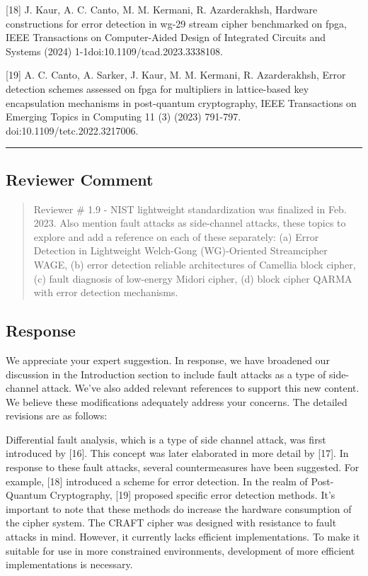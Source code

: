 [18] J. Kaur, A. C. Canto, M. M. Kermani, R. Azarderakhsh, Hardware constructions for error detection in wg-29 stream cipher benchmarked on fpga, IEEE Transactions on Computer-Aided Design of Integrated Circuits and Systems (2024) 1-1doi:10.1109/tcad.2023.3338108.

[19] A. C. Canto, A. Sarker, J. Kaur, M. M. Kermani, R. Azarderakhsh, Error detection schemes assessed on fpga for multipliers in lattice-based key encapsulation mechanisms in post-quantum cryptography, IEEE Transactions on Emerging Topics in Computing 11 (3) (2023) 791-797. doi:10.1109/tetc.2022.3217006.

\color{black}

\noindent\rule{\linewidth}{2.0pt}

\subsection{Reviewer Comment}
\begin{mdframed}
	\begin{quote}
		Reviewer \# 1.9 - NIST lightweight standardization was finalized in Feb. 2023. Also mention fault attacks as side-channel attacks, these topics to explore and add a reference on each of these separately: (a) Error Detection in Lightweight Welch-Gong (WG)-Oriented Streamcipher WAGE, (b) error detection reliable architectures of Camellia block cipher, (c) fault diagnosis of low-energy Midori cipher, (d) block cipher QARMA with error detection mechanisms.
	\end{quote}
\end{mdframed}

\subsection{Response}

We appreciate your expert suggestion. In response, we have broadened our discussion in the Introduction section to include fault attacks as a type of side-channel attack. We've also added relevant references to support this new content. We believe these modifications adequately address your concerns. The detailed revisions are as follows:

\color{blue}

Differential fault analysis, which is a type of side channel attack, was first introduced by [16]. This concept was later elaborated in more detail by [17]. In response to these fault attacks, several countermeasures have been suggested. For example, [18] introduced a scheme for error detection. In the realm of Post-Quantum Cryptography, [19] proposed specific error detection methods. It's important to note that these methods do increase the hardware consumption of the cipher system. The CRAFT cipher was designed with resistance to fault attacks in mind. However, it currently lacks efficient implementations. To make it suitable for use in more constrained environments, development of more efficient implementations is necessary.

